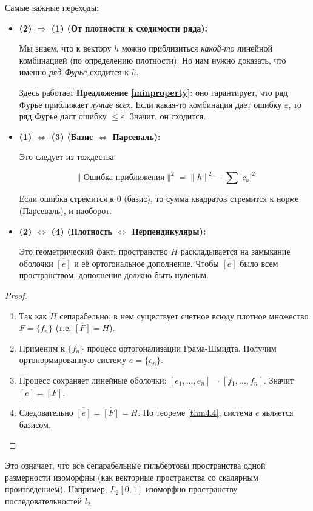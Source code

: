	\begin{idea}
		
		Самые важные переходы:
		
		\begin{itemize}
			
			\item \textbf{(2) $\Rightarrow$ (1) (От плотности к сходимости ряда):}
			
			Мы знаем, что к вектору $h$ можно приблизиться \textit{какой-то} линейной комбинацией (по определению плотности). Но нам нужно доказать, что именно \textit{ряд Фурье} сходится к $h$.
			
			Здесь работает \textbf{Предложение \ref{minproperty}}: оно гарантирует, что ряд Фурье приближает \textit{лучше всех}. Если какая-то комбинация дает ошибку $\varepsilon$, то ряд Фурье даст ошибку $\le \varepsilon$. Значит, он сходится.
			
			\item \textbf{(1) $\Leftrightarrow$ (3) (Базис $\Leftrightarrow$ Парсеваль):}
			
			Это следует из тождества:
			
			\[ \|\text{Ошибка приближения}\|^2 = \|h\|^2 - \sum |c_k|^2 \]
			
			Если ошибка стремится к 0 (базис), то сумма квадратов стремится к норме (Парсеваль), и наоборот.
			
			
			
			\item \textbf{(2) $\Leftrightarrow$ (4) (Плотность $\Leftrightarrow$ Перпендикуляры):}
			
			Это геометрический факт: пространство $H$ раскладывается на замыкание оболочки $\overline{[e]}$ и её ортогональное дополнение. Чтобы $\overline{[e]}$ было всем пространством, дополнение должно быть нулевым.
			
		\end{itemize}
		
	\end{idea}

\begin{proof}
	\begin{enumerate}
		\item Так как $H$ сепарабельно, в нем существует счетное всюду плотное множество $F = \{f_n\}$ (т.е. $\overline{[F]} = H$).
		\item Применим к $\{f_n\}$ процесс ортогонализации Грама-Шмидта. Получим ортонормированную систему $e = \{e_n\}$.
		\item Процесс сохраняет линейные оболочки: $[e_1, \dots, e_n] = [f_1, \dots, f_n]$. Значит $[e] = [F]$.
		\item Следовательно $\overline{[e]} = \overline{[F]} = H$. По теореме \ref{thm4.4}, система $e$ является базисом.
	\end{enumerate}
\end{proof}

\begin{remark}
	Это означает, что все сепарабельные гильбертовы пространства одной размерности изоморфны (как векторные пространства со скалярным произведением). Например, $L_2[0, 1]$ изоморфно пространству последовательностей $l_2$.
\end{remark}